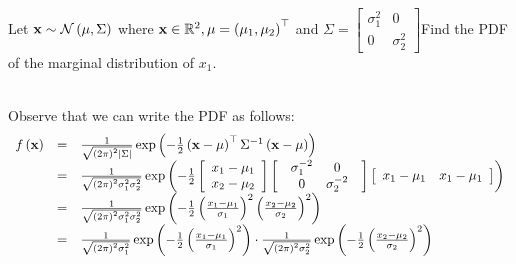 \begin{exercise}
Let $\mathbf{x}\sim \mathcal{N}\left(\mu,\Sigma\right)$ where $\mathbf{x}\in\mathbb{R}^2, \mu=\left(\mu_1,\mu_2\right)^\top$ and $\Sigma=\left[\begin{array}{cc}\sigma_1^2&0\\0&\sigma_2^2\end{array}\right]$Find the PDF of the marginal distribution of $x_1$.

~\\Observe that we can write the PDF as follows:
$$
\begin{array}{ccl}
	f\left(\mathbf{x}\right) & = & \frac{1}{\sqrt{\left(2\pi\right)^{2}\left|\Sigma\right|}}\exp\left(-\frac{1}{2}\left(\mathbf{x}-\mu\right)^{\top}\Sigma^{-1}\left(\mathbf{x}-\mu\right)\right)\\
	& = & \frac{1}{\sqrt{\left(2\pi\right)^{2}\sigma_{1}^{2}\sigma_{2}^{2}}}\exp\left(-\frac{1}{2}\left[\begin{array}{c}
		x_{1}-\mu_{1}\\
		x_{2}-\mu_{2}
	\end{array}\right]\left[\begin{array}{c}
		\begin{array}{cc}
			\sigma_{1}^{-2} & 0\\
			0 & \sigma_{2}^{-2}
	\end{array}\end{array}\right]\left[\begin{array}{cc}
		x_{1}-\mu_{1} & x_{1}-\mu_{1}\end{array}\right]\right)\\
	& = & \frac{1}{\sqrt{\left(2\pi\right)^{2}\sigma_{1}^{2}\sigma_{2}^{2}}}\exp\left(-\frac{1}{2}\left(\frac{x_{1}-\mu_{1}}{\sigma_{1}}\right)^{2}\left(\frac{x_{2}-\mu_{2}}{\sigma_{2}}\right)^{2}\right)\\
	& = & \frac{1}{\sqrt{\left(2\pi\right)^{2}\sigma_{1}^{2}}}\exp\left(-\frac{1}{2}\left(\frac{x_{1}-\mu_{1}}{\sigma_{1}}\right)^{2}\right)\cdot\frac{1}{\sqrt{\left(2\pi\right)^{2}\sigma_{2}^{2}}}\exp\left(-\frac{1}{2}\left(\frac{x_{2}-\mu_{2}}{\sigma_{2}}\right)^{2}\right)
\end{array}
$$


\end{exercise}

